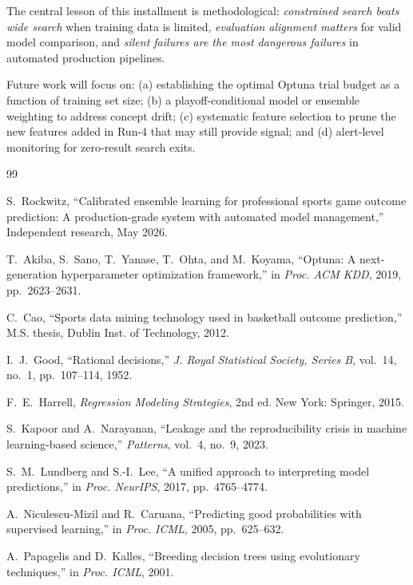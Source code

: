 \documentclass[conference]{IEEEtran}
\begin{document}
The central lesson of this installment is methodological:
\emph{constrained search beats wide search} when training data is
limited, \emph{evaluation alignment matters} for valid model
comparison, and \emph{silent failures are the most dangerous failures}
in automated production pipelines.

Future work will focus on: (a) establishing the optimal Optuna trial
budget as a function of training set size; (b) a playoff-conditional
model or ensemble weighting to address concept drift; (c) systematic
feature selection to prune the new features added in Run-4 that may
still provide signal; and (d) alert-level monitoring for zero-result
search exits.


\begin{thebibliography}{99}

S.~Rockwitz,
``Calibrated ensemble learning for professional sports game outcome
prediction: A production-grade system with automated model management,''
Independent research, May 2026.

T.~Akiba, S.~Sano, T.~Yanase, T.~Ohta, and M.~Koyama,
``Optuna: A next-generation hyperparameter optimization framework,''
in \emph{Proc. ACM KDD}, 2019, pp.~2623--2631.

C.~Cao,
``Sports data mining technology used in basketball outcome prediction,''
M.S. thesis, Dublin Inst. of Technology, 2012.

I.~J.~Good,
``Rational decisions,''
\emph{J. Royal Statistical Society, Series B}, vol.~14, no.~1,
pp.~107--114, 1952.

F.~E.~Harrell,
\emph{Regression Modeling Strategies}, 2nd ed.
New York: Springer, 2015.

S.~Kapoor and A.~Narayanan,
``Leakage and the reproducibility crisis in machine learning-based
science,''
\emph{Patterns}, vol.~4, no.~9, 2023.

S.~M.~Lundberg and S.-I.~Lee,
``A unified approach to interpreting model predictions,''
in \emph{Proc. NeurIPS}, 2017, pp.~4765--4774.

A.~Niculescu-Mizil and R.~Caruana,
``Predicting good probabilities with supervised learning,''
in \emph{Proc. ICML}, 2005, pp.~625--632.

A.~Papagelis and D.~Kalles,
``Breeding decision trees using evolutionary techniques,''
in \emph{Proc. ICML}, 2001.


\end{thebibliography}
\end{document}
